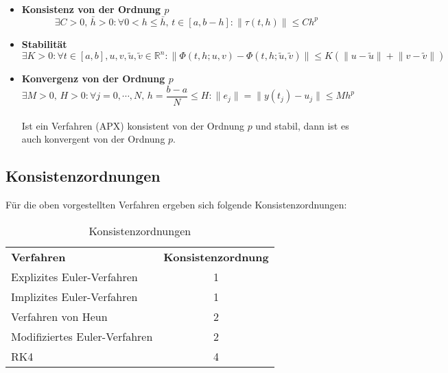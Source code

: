 \documentclass[a4paper, 11pt, accentcolor = tud3b]{tudreport}
\newcommand{\norm}[1]{\ensuremath{\lVert #1 \rVert}}
\newcommand{\R}{\ensuremath{\mathbb{R}}}
\begin{document}
	        \begin{itemize}
	        	\item \textbf{Konsistenz von der Ordnung \(p\)}
		        	\begin{equation*}
			        	\exists C > 0,\, \bar{h} > 0 : \forall 0 < h \leq \bar{h},\, t \in [a, b - h] : \norm{\tau(t, h)} \leq C h^p
		        	\end{equation*}
	        	\item \textbf{Stabilität}
		        	\begin{equation*}
			        	\exists K > 0 : \forall t \in [a, b], u, v, \tilde{u}, \tilde{v} \in \R^n : \norm{\Phi(t, h; u, v) - \Phi(t, h; \tilde{u}, \tilde{v})} \leq K (\norm{u - \tilde{u}} + \norm{v - \tilde{v}})
		        	\end{equation*}
	        	\item \textbf{Konvergenz von der Ordnung \(p\)}
		        	\begin{equation*}
			        	\exists M > 0,\, H > 0 : \forall j = 0, \cdots, N,\, h = \frac{b-a}{N} \leq H : \norm{e_j} = \norm{y(t_j) - u_j} \leq M h^p
		        	\end{equation*} \\ Ist ein Verfahren (APX) konsistent von der Ordnung \(p\) und stabil, dann ist es auch konvergent von der Ordnung \(p\).
	        \end{itemize}
	
	        \subsection{Konsistenzordnungen}
		        Für die oben vorgestellten Verfahren ergeben sich folgende Konsistenzordnungen:
		        \begin{table}[H]
		        	\centering
		        	\begin{tabular}{l c}
		        		\textbf{Verfahren}            & \textbf{Konsistenzordnung} \\
		        		Explizites Euler-Verfahren    & 1                          \\
		        		Implizites Euler-Verfahren    & 1                          \\
		        		Verfahren von Heun            & 2                          \\
		        		Modifiziertes Euler-Verfahren & 2                          \\
		        		RK4                           & 4
		        	\end{tabular}
		        	\caption{Konsistenzordnungen}
		        	\label{tab:consistency}
		        \end{table}
	
\end{document}
